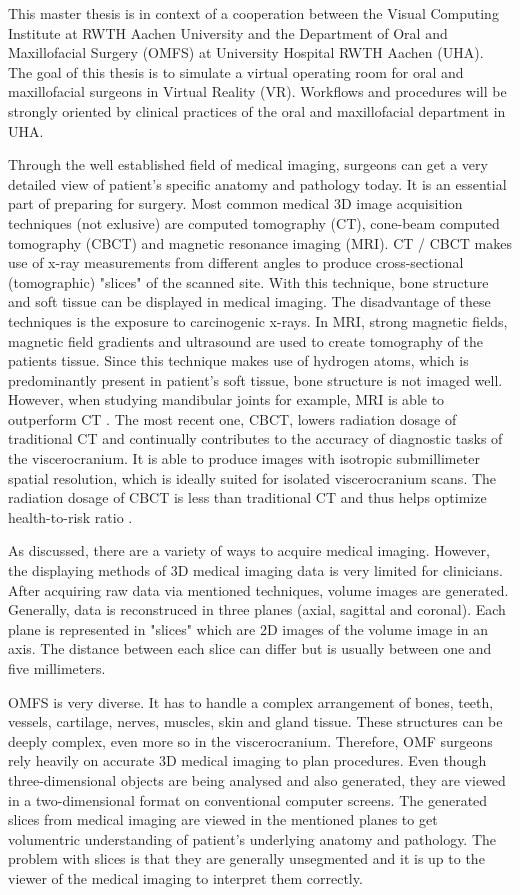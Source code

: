 This master thesis is in context of a cooperation between the Visual Computing Institute at RWTH Aachen University and the Department of Oral and Maxillofacial Surgery (OMFS) at University Hospital RWTH Aachen (UHA).
The goal of this thesis is to simulate a virtual operating room for oral and maxillofacial surgeons in Virtual Reality (VR).
Workflows and procedures will be strongly oriented by clinical practices of the oral and maxillofacial department in UHA.

Through the well established field of medical imaging, surgeons can get a very detailed view of patient’s specific anatomy and pathology today. 
It is an essential part of preparing for surgery.
Most common medical 3D image acquisition techniques (not exlusive) are computed tomography (CT), cone-beam computed tomography (CBCT) and magnetic resonance imaging (MRI).
CT / CBCT makes use of x-ray measurements from different angles to produce cross-sectional (tomographic) "slices" of the scanned site.
With this technique, bone structure and soft tissue can be displayed in medical imaging.
The disadvantage of these techniques is the exposure to carcinogenic x-rays.
In MRI, strong magnetic fields, magnetic field gradients and ultrasound are used to create tomography of the patients tissue.
Since this technique makes use of hydrogen atoms, which is predominantly present in patient's soft tissue, bone structure is not imaged well.
However, when studying mandibular joints for example, MRI is able to outperform CT \cite{RN65}.
The most recent one, CBCT, lowers radiation dosage of traditional CT and continually contributes to the accuracy of diagnostic tasks of the viscerocranium.
It is able to produce images with isotropic submillimeter spatial resolution, which is ideally suited for isolated viscerocranium scans. 
The radiation dosage of CBCT is less than traditional CT and thus helps optimize health-to-risk ratio \cite{WHITE2008689}.

As discussed, there are a variety of ways to acquire medical imaging.
However, the displaying methods of 3D medical imaging data is very limited for clinicians.
After acquiring raw data via mentioned techniques, volume images are generated. 
Generally, data is reconstruced in three planes (axial, sagittal and coronal).
Each plane is represented in "slices" which are 2D images of the volume image in an axis.
The distance between each slice can differ but is usually between one and five millimeters.

OMFS is very diverse. It has to handle a complex arrangement of bones, teeth, vessels, cartilage, nerves, muscles, skin and gland tissue.
These structures can be deeply complex, even more so in the viscerocranium.
Therefore, OMF surgeons rely heavily on accurate 3D medical imaging to plan procedures.
Even though three-dimensional objects are being analysed and also generated, they are viewed in a two-dimensional format on conventional computer screens.
The generated slices from medical imaging are viewed in the mentioned planes to get volumentric understanding of patient's underlying anatomy and pathology.
The problem with slices is that they are generally unsegmented and it is up to the viewer of the medical imaging to interpret them correctly.

